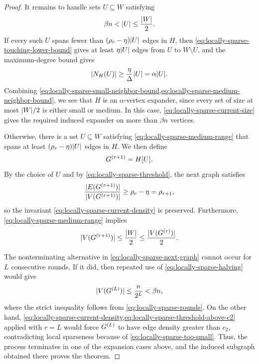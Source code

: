 \begin{proof}
	It remains to handle sets \(U\subseteq W\) satisfying
	\begin{equation}
		\label{eq:locally-sparse-medium-range}
		\beta n<\lvert U\rvert\leq \frac{\lvert W\rvert}{2}.
	\end{equation}
	If every such \(U\) spans fewer than \((\rho_r-\eta)\lvert U\rvert\) edges in \(H\), then \cref{eq:locally-sparse-touching-lower-bound} gives at least \(\eta\lvert U\rvert\) edges from \(U\) to \(W\setminus U\), and the maximum-degree bound gives
	\begin{equation}
		\label{eq:locally-sparse-medium-neighbor-bound}
		\lvert N_H(U)\rvert\geq \frac{\eta}{\Delta}\lvert U\rvert=\alpha\lvert U\rvert.
	\end{equation}
	Combining \cref{eq:locally-sparse-small-neighbor-bound,eq:locally-sparse-medium-neighbor-bound}, we see that \(H\) is an \(\alpha\)-vertex expander, since every set of size at most \(\lvert W\rvert/2\) is either small or medium. In this case, \cref{eq:locally-sparse-current-size} gives the required induced expander on more than \(\beta n\) vertices.

	Otherwise, there is a set \(U\subseteq W\) satisfying \cref{eq:locally-sparse-medium-range} that spans at least \((\rho_r-\eta)\lvert U\rvert\) edges in \(H\). We then define
	\begin{equation}
		\label{eq:locally-sparse-next-graph}
		G^{(r+1)}=H[U].
	\end{equation}
	By the choice of \(U\) and by \cref{eq:locally-sparse-threshold}, the next graph satisfies
	\begin{equation}
		\label{eq:locally-sparse-next-density}
		\frac{\lvert E(G^{(r+1)})\rvert}{\lvert V(G^{(r+1)})\rvert}\geq \rho_r-\eta=\rho_{r+1},
	\end{equation}
	so the invariant \cref{eq:locally-sparse-current-density} is preserved. Furthermore, \cref{eq:locally-sparse-medium-range} implies
	\begin{equation}
		\label{eq:locally-sparse-halving}
		\lvert V(G^{(r+1)})\rvert\leq \frac{\lvert W\rvert}{2}\leq \frac{\lvert V(G^{(r)})\rvert}{2}.
	\end{equation}

	The nonterminating alternative in \cref{eq:locally-sparse-next-graph} cannot occur for \(L\) consecutive rounds. If it did, then repeated use of \cref{eq:locally-sparse-halving} would give
	\begin{equation}
		\label{eq:locally-sparse-too-small}
		\lvert V(G^{(L)})\rvert\leq \frac{n}{2^L}<\beta n,
	\end{equation}
	where the strict inequality follows from \cref{eq:locally-sparse-rounds}. On the other hand, \cref{eq:locally-sparse-current-density,eq:locally-sparse-threshold-above-c2} applied with \(r=L\) would force \(G^{(L)}\) to have edge density greater than \(c_2\), contradicting local sparseness because of \cref{eq:locally-sparse-too-small}. Thus, the process terminates in one of the expansion cases above, and the induced subgraph obtained there proves the theorem.
\end{proof}

